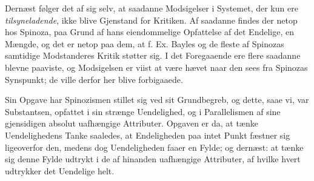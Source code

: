 \documentclass[12pt,a4paper]{book}
\newcommand{\opage}[1]{\marginnote{\footnotesize\textit{[#1]}}}
\begin{document}
Dernæst følger det af sig selv, at saadanne Modsigelser
i Systemet, der kun ere \emph{tilsyneladende}, ikke blive
Gjenstand for Kritiken. Af saadanne findes der netop hos
Spinoza, paa Grund af hans eiendommelige Opfattelse af
\opage{175} \setcounter{footnote}{0}%
det Endelige, en Mængde, og det er netop paa dem, at
f. Ex. Bayles og de fleste af Spinozas samtidige Modstanderes
Kritik støtter sig. I det Foregaaende ere flere saadanne
blevne paaviste, og Modsigelsen er viist at være hævet naar
den sees fra Spinozas Synspunkt; de ville derfor her blive
forbigaaede.

Sin Opgave har Spinozismen stillet sig ved sit Grundbegreb,
og dette, saae vi, var Substantsen, opfattet i sin
strænge Uendelighed, og i Parallelismen af sine gjensidigen
absolut uafhængige Attributer. Opgaven er da, at tænke
Uendelighedens Tanke saaledes, at Endeligheden paa intet
Punkt fæstner sig ligeoverfor den, medens dog Uendeligheden
faaer en Fylde; og dernæst: at tænke sig denne Fylde
udtrykt i de af hinanden uafhængige Attributer, af hvilke
hvert udtrykker det Uendelige helt.
\end{document}

